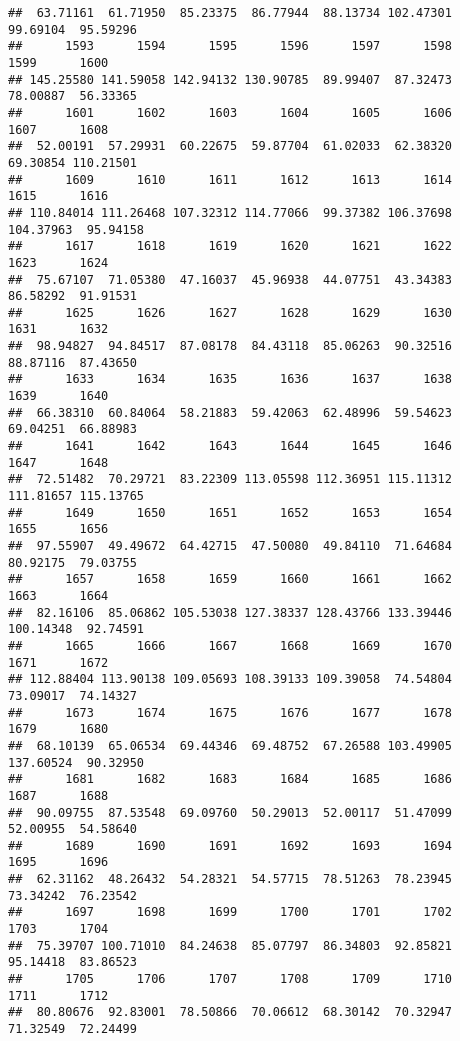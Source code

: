 \documentclass[
]{article}
\begin{document}
\begin{verbatim}
##  63.71161  61.71950  85.23375  86.77944  88.13734 102.47301  99.69104  95.59296 
##      1593      1594      1595      1596      1597      1598      1599      1600 
## 145.25580 141.59058 142.94132 130.90785  89.99407  87.32473  78.00887  56.33365 
##      1601      1602      1603      1604      1605      1606      1607      1608 
##  52.00191  57.29931  60.22675  59.87704  61.02033  62.38320  69.30854 110.21501 
##      1609      1610      1611      1612      1613      1614      1615      1616 
## 110.84014 111.26468 107.32312 114.77066  99.37382 106.37698 104.37963  95.94158 
##      1617      1618      1619      1620      1621      1622      1623      1624 
##  75.67107  71.05380  47.16037  45.96938  44.07751  43.34383  86.58292  91.91531 
##      1625      1626      1627      1628      1629      1630      1631      1632 
##  98.94827  94.84517  87.08178  84.43118  85.06263  90.32516  88.87116  87.43650 
##      1633      1634      1635      1636      1637      1638      1639      1640 
##  66.38310  60.84064  58.21883  59.42063  62.48996  59.54623  69.04251  66.88983 
##      1641      1642      1643      1644      1645      1646      1647      1648 
##  72.51482  70.29721  83.22309 113.05598 112.36951 115.11312 111.81657 115.13765 
##      1649      1650      1651      1652      1653      1654      1655      1656 
##  97.55907  49.49672  64.42715  47.50080  49.84110  71.64684  80.92175  79.03755 
##      1657      1658      1659      1660      1661      1662      1663      1664 
##  82.16106  85.06862 105.53038 127.38337 128.43766 133.39446 100.14348  92.74591 
##      1665      1666      1667      1668      1669      1670      1671      1672 
## 112.88404 113.90138 109.05693 108.39133 109.39058  74.54804  73.09017  74.14327 
##      1673      1674      1675      1676      1677      1678      1679      1680 
##  68.10139  65.06534  69.44346  69.48752  67.26588 103.49905 137.60524  90.32950 
##      1681      1682      1683      1684      1685      1686      1687      1688 
##  90.09755  87.53548  69.09760  50.29013  52.00117  51.47099  52.00955  54.58640 
##      1689      1690      1691      1692      1693      1694      1695      1696 
##  62.31162  48.26432  54.28321  54.57715  78.51263  78.23945  73.34242  76.23542 
##      1697      1698      1699      1700      1701      1702      1703      1704 
##  75.39707 100.71010  84.24638  85.07797  86.34803  92.85821  95.14418  83.86523 
##      1705      1706      1707      1708      1709      1710      1711      1712 
##  80.80676  92.83001  78.50866  70.06612  68.30142  70.32947  71.32549  72.24499 

\end{verbatim}
\end{document}
